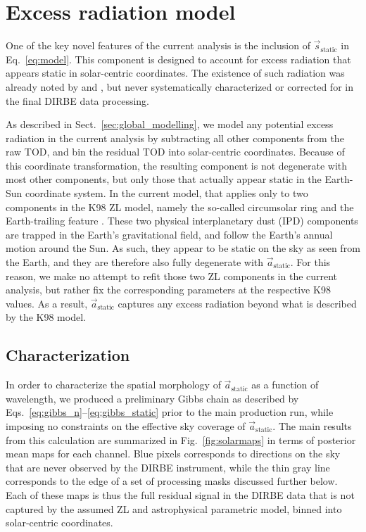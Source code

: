 \documentclass{aa}
\newcommand{\s}[0]{\vec{s}}
\renewcommand{\a}[0]{\vec{a}}
\begin{document}
  
  



\section{Excess radiation model}
\label{sec:excess}

One of the key novel features of the current analysis is the inclusion
of $\s_{\mathrm{static}}$ in Eq.~\eqref{eq:model}. This component is
designed to account for excess radiation that appears static in
solar-centric coordinates. The existence of such radiation was already
noted by \citet{reach:1995} and \citet{leinert:1998}, but never
systematically characterized or corrected for in the final DIRBE data
processing.

As described in Sect.~\ref{sec:global_modelling}, we model any
potential excess radiation in the current analysis by subtracting all
other components from the raw TOD, and bin the residual TOD into
solar-centric coordinates. Because of this coordinate transformation,
the resulting component is not degenerate with most other components,
but only those that actually appear static in the Earth-Sun coordinate
system. In the current model, that applies only to two components in the
K98 ZL model, namely the so-called circumsolar ring and the
Earth-trailing feature \citep{kelsall1998}. These two physical
interplanetary dust (IPD) components are trapped in the Earth's
gravitational field, and follow the Earth's annual motion around the
Sun. As such, they appear to be static on the sky as seen from the
Earth, and they are therefore also fully degenerate with
$\a_{\mathrm{static}}$. For this reason, we make no attempt to refit
those two ZL components in the current analysis, but rather fix the
corresponding parameters at the respective K98 values. As a result,
$\a_{\mathrm{static}}$ captures any excess radiation beyond what is
described by the K98 model.

\subsection{Characterization}

In order to characterize the spatial morphology of
$\a_{\mathrm{static}}$ as a function of wavelength, we produced a
preliminary Gibbs chain as described by
Eqs.~\eqref{eq:gibbs_n}--\eqref{eq:gibbs_static} prior to the main
production run, while imposing no constraints on the effective sky
coverage of $\a_{\mathrm{static}}$. The main results from this
calculation are summarized in Fig.~\ref{fig:solarmaps} in terms of
posterior mean maps for each channel. Blue pixels corresponds to
directions on the sky that are never observed by the DIRBE instrument,
while the thin gray line corresponds to the edge of a set of
processing masks discussed further below. Each of these maps is thus
the full residual signal in the DIRBE data that is not
captured by the assumed ZL and astrophysical parametric model, binned
into solar-centric coordinates.
\end{document}
